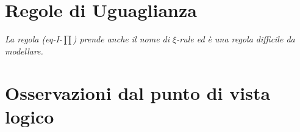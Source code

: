 \section{Regole di Uguaglianza}
\label{sec: uguaglianza-prodottop-dip}
\begin{prooftree}
\end{prooftree}

\begin{prooftree}
\end{prooftree}
\textit{La regola (eq-I-{\scriptsize$\prod$}) prende anche il nome di $\xi$-rule ed \`e una regola difficile da modellare.}

\begin{prooftree}
\end{prooftree}
\normalsize

\section{Osservazioni dal punto di vista logico}
\label{sec:osservazioni-dal-punto-di-vista-logico-prodotto-dip}

